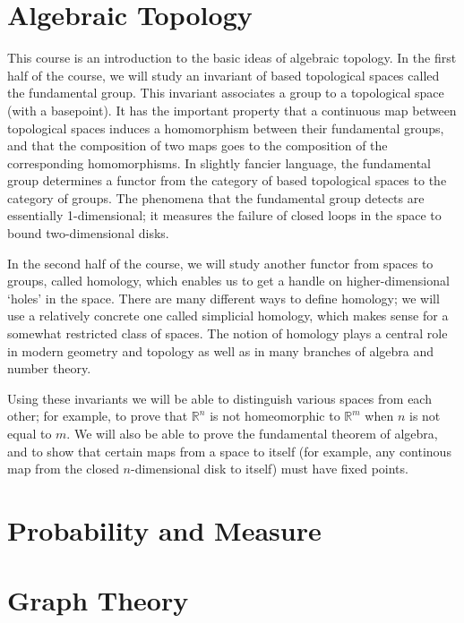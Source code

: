 \newcommand{\yearnumber}{II}


\chapter{Algebraic Topology}
This course is an introduction to the basic ideas of algebraic topology. In the first half of the course, we will study an invariant of based topological spaces called the fundamental group. This invariant associates a group to a topological space (with a basepoint). It has the important property that a continuous map between topological spaces induces a homomorphism between their fundamental groups, and that the composition of two maps goes to the composition of the corresponding homomorphisms. In slightly fancier language, the fundamental group determines a functor from the category of based topological spaces to the category of groups. The phenomena that the fundamental group detects are essentially 1-dimensional; it measures the failure of closed loops in the space to bound two-dimensional disks.

In the second half of the course, we will study another functor from spaces to groups, called homology, which enables us to get a handle on higher-dimensional `holes' in the space. There are many different ways to define homology; we will use a relatively concrete one called simplicial homology, which makes sense for a somewhat restricted class of spaces. The notion of homology plays a central role in modern geometry and topology as well as in many branches of algebra and number theory.

Using these invariants we will be able to distinguish various spaces from each other; for example, to prove that \( \mathbb R^n \) is not homeomorphic to \( \mathbb R^m \) when \( n \) is not equal to \( m \). We will also be able to prove the fundamental theorem of algebra, and to show that certain maps from a space to itself (for example, any continous map from the closed \( n \)-dimensional disk to itself) must have fixed points.


\chapter{Probability and Measure}

\chapter{Graph Theory}

